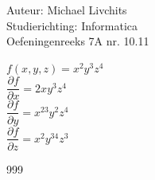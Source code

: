 \documentclass[a4paper]{article}
\begin{document}
  
\noindent \large Auteur: Michael Livchits \\
\noindent \large Studierichting: Informatica\\
\noindent \large Oefeningenreeks 7A nr. 10.11\\

\medskip

\normalsize

$f(x,y,z) = x^2y^3z^4$\\

$\dfrac{\partial f}{\partial x} = 2xy^3z^4$\\

$\dfrac{\partial f}{\partial y} = x^23y^2z^4$\\

$\dfrac{\partial f}{\partial z} = x^2y^34z^3$\\

\begin{thebibliography}{999}
\end{thebibliography}
\end{document}
